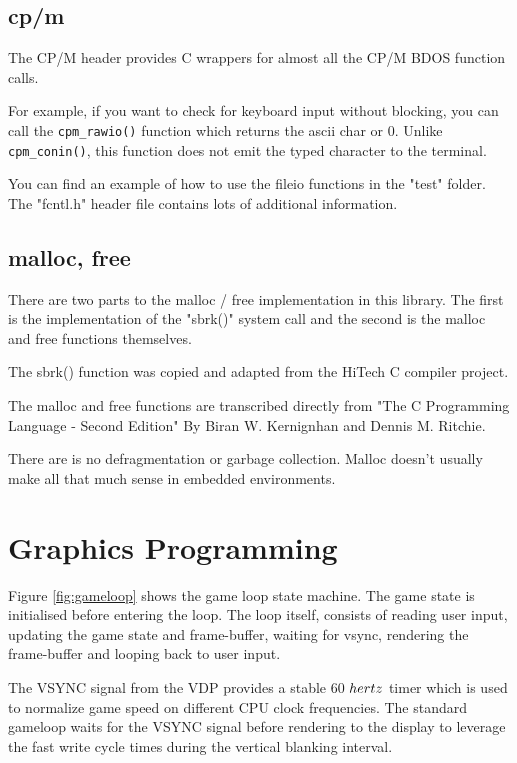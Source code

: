\documentclass[10pt,a4paper]{article}
\begin{document}
\subsection{cp/m}
The CP/M header provides C wrappers for almost all the CP/M BDOS function calls.

For example, if you want to check for keyboard input without blocking, you can
call the \texttt{cpm\_rawio()} function which returns the ascii char or 0.
Unlike \texttt{cpm\_conin()}, this function does not emit the typed character to
the terminal.

You can find an example of how to use the fileio functions in the "test"
folder.  The "fcntl.h" header file contains lots of additional information.

\subsection{malloc, free}
There are two parts to the malloc / free implementation in this library.  The
first is the implementation of the "sbrk()" system call and the second is the
malloc and free functions themselves.

The sbrk() function was copied and adapted from the HiTech C compiler project.

The malloc and free functions are transcribed directly from "The C Programming
Language - Second Edition" By Biran W. Kernignhan and Dennis M. Ritchie.

There are is no defragmentation or garbage collection.  Malloc doesn't usually
make all that much sense in embedded environments.

\pagebreak
\section{Graphics Programming} \label{graphicsprogramming}

Figure \ref{fig:gameloop} shows the game loop state machine.  The game state is
initialised before entering the loop.  The loop itself, consists of reading user
input, updating the game state and frame-buffer, waiting for vsync, rendering
the frame-buffer and looping back to user input.

The VSYNC signal from the VDP provides a stable 60 ${\\hertz}$ timer which is
used to normalize game speed on different CPU clock frequencies.  The standard
gameloop waits for the VSYNC signal before rendering to the display to leverage
the fast write cycle times during the vertical blanking interval.
\end{document}
